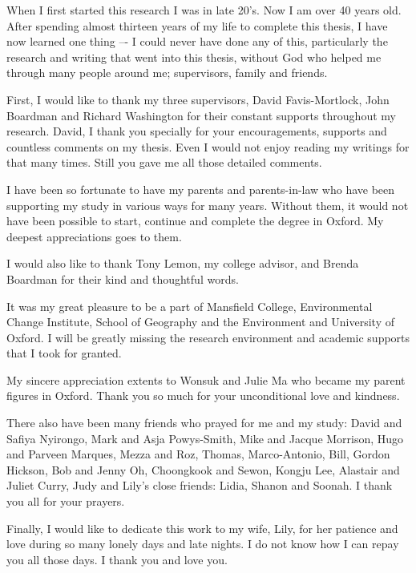 \begin{acknowledgements}

When I first started this research I was in late 20's. Now I am over 40
years old. After spending almost thirteen years of my life to complete this
thesis, I have now learned one thing –- I could never have done any of this,
particularly the research and writing that went into this thesis, without God
who helped me through many people around me; supervisors, family and friends.

\vspace{3 mm}

First, I would like to thank my three supervisors, David Favis-Mortlock, John
Boardman and Richard Washington for their constant supports throughout my
research. David, I thank you specially for your encouragements, supports and
countless comments on my thesis. Even I would not enjoy reading my writings for
that many times. Still you gave me all those detailed comments.

\vspace{3 mm}

I have been so fortunate to have my parents and parents-in-law who have been
supporting my study in various ways for many years. Without them, it would
not have been possible to start, continue and complete the degree in Oxford. My
deepest appreciations goes to them.

\vspace{3 mm}

I would also like to thank Tony Lemon, my college advisor, and Brenda Boardman
for their kind and thoughtful words.

\vspace{3 mm}

It was my great pleasure to be a part of Mansfield College, Environmental Change
Institute, School of Geography and the Environment and University of Oxford. I
will be greatly missing the research environment and academic supports that I
took for granted.

\vspace{3 mm}

My sincere appreciation extents to Wonsuk and Julie Ma who became my parent
figures in Oxford. Thank you so much for your unconditional love and kindness.

\vspace{3 mm}

There also have been many friends who prayed for me and my study: David and
Safiya Nyirongo, Mark and Asja Powys-Smith, Mike and Jacque Morrison, Hugo and
Parveen Marques, Mezza and Roz, Thomas, Marco-Antonio, Bill, Gordon Hickson, Bob
and Jenny Oh, Choongkook and Sewon, Kongju Lee, Alastair and Juliet Curry, Judy
and Lily's close friends: Lidia, Shanon and Soonah. I thank you all for your
prayers.

\vspace{3 mm}

Finally, I would like to dedicate this work to my wife, Lily, for her patience
and love during so many lonely days and late nights. I do not know how I can
repay you all those days. I thank you and love you.

\end{acknowledgements}